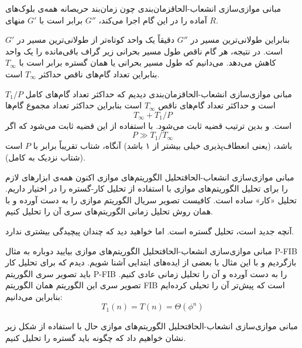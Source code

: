 \begin{itemframe-s}{مبانی موازی‌سازی انشعاب-الحاق}{زمان‌بندی}
\itm
چون زمان‌بند حریصانه همه‌ی بلوک‌های آماده را در این گام اجرا می‌کند،
$G''$
برابر است با
$G'$
 منهای
$R$.
\itm

بنابراین طولانی‌ترین مسیر در
$G''$
دقیقاً یک واحد کوتاه‌تر از طولانی‌ترین مسیر در
$G'$
است. در نتیجه، هر گام ناقص طول مسیر بحرانی زیر گراف باقی‌مانده را یک واحد کاهش می‌دهد.
\itm
می‌دانیم که طول مسیر بحرانی یا همان گستره برابر است با
$T_∞$
بنابراین تعداد گام‌های ناقص حداکثر
$T_∞$
است.
\end{itemframe-s}


\begin{itemframe-s}{مبانی موازی‌سازی انشعاب-الحاق}{زمان‌بندی}
\itm
دیدیم که حداکثر تعداد گام‌های کامل $T_1 / P$ است و حداکثر تعداد گام‌های ناقص $T_∞$ است بنابراین حداکثر تعداد مجموع گام‌ها
$$T_∞+T_1 / P$$
است. و بدین ترتیب قضیه ثابت می‌شود.
\itm
با استفاده از این قضیه ثابت می‌شود که اگر
$$P \gg T_1 / T_∞$$
باشد، (یعنی انعطاف‌پذیری خیلی بیشتر از ۱ باشد) آنگاه،
شتاب تقریباً برابر با $P$ است (شتاب نزدیک به کامل).
\end{itemframe-s}


\begin{itemframe-s}{مبانی موازی‌سازی انشعاب-الحاق}{تحلیل الگوریتم‌های موازی}
\itm
اکنون همه‌ی ابزارهای لازم را برای تحلیل الگوریتم‌های موازی با استفاده از تحلیل کار-گستره را در اختیار داریم.
\itm
تحلیل «کار» ساده است. کافیست تصویر سریال الگوریتم موازی را به دست آورده و با همان روش تحلیل زمانی الگوریتم‌های سری آن را تحلیل کنیم.

\itm
آنچه جدید است، تحلیل گستره است. اما خواهید دید که چندان پیچیدگی بیشتری ندارد.
\end{itemframe-s}


\begin{itemframe-s}{مبانی موازی‌سازی انشعاب-الحاق}{تحلیل الگوریتم‌های موازی}
\itm
بیایید دوباره به مثال P-FIB بازگردیم و با این مثال با بعضی از ایده‌های ابتدایی آشنا شویم.
\itm
دیدم که برای تحلیل کار باید تصویر سری الگوریتم P-FIB را به دست آورده و آن را تحلیل زمانی عادی کنیم. تصویر سری این الگوریتم همان الگوریتم FIB است که پیش‌تر آن را تحیلی کرده‌ایم بنابراین می‌دانیم:
$$T_1(n) = T(n) = \Theta(\phi^n)$$
\end{itemframe-s}


\begin{itemframe-s}{مبانی موازی‌سازی انشعاب-الحاق}{تحلیل الگوریتم‌های موازی}
\itm
حال با استفاده از شکل زیر نشان خواهیم داد که چگونه باید گستره را تحلیل کنیم.
\end{itemframe-s}


